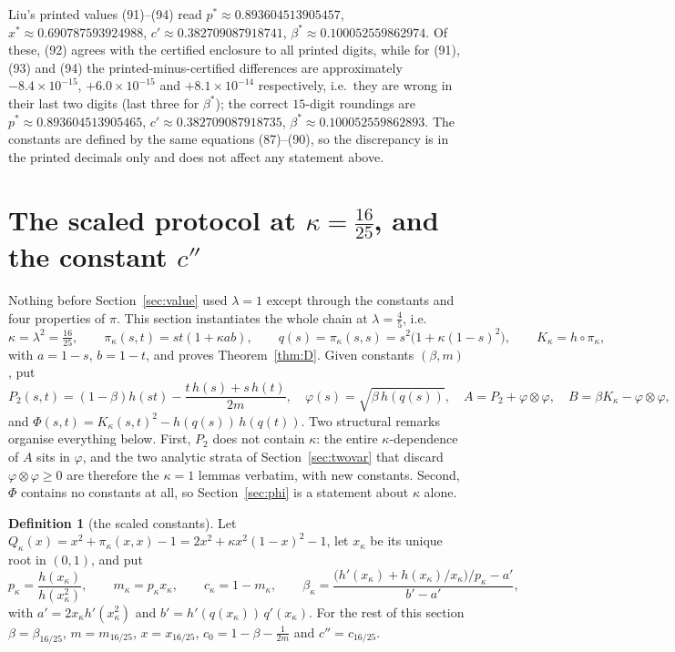 \documentclass[11pt]{article}
\theoremstyle{plain}
\theoremstyle{definition}
\newtheorem{definition}[theorem]{Definition}
\theoremstyle{remark}
\begin{document}
Liu's printed values (91)--(94) read $p^\ast\approx0.893604513905457$,
$x^\ast\approx0.690787593924988$, $c'\approx0.382709087918741$,
$\beta^\ast\approx0.100052559862974$.  Of these, (92) agrees with the
certified enclosure to all printed digits, while for (91), (93) and (94)
the printed-minus-certified differences are approximately
$-8.4\times10^{-15}$, $+6.0\times10^{-15}$ and $+8.1\times10^{-14}$
respectively, i.e.\ they are wrong in their last two digits (last three for
$\beta^\ast$); the correct $15$-digit roundings are
$p^\ast\approx0.893604513905465$, $c'\approx0.382709087918735$,
$\beta^\ast\approx0.100052559862893$.  The constants are defined by the
same equations (87)--(90), so the discrepancy is in the printed decimals
only and does not affect any statement above.

\section{The scaled protocol at \texorpdfstring{$\kappa=\tfrac{16}{25}$}{kappa=16/25}, and the constant \texorpdfstring{$c''$}{c''}}\label{sec:scaled}

Nothing before Section~\ref{sec:value} used $\lambda=1$ except through the
constants and four properties of $\pi$.  This section instantiates the whole
chain at $\lambda=\tfrac45$, i.e.
\begin{equation}\label{eq:kappa-objects}
  \kappa=\lambda^2=\tfrac{16}{25},\qquad
  \pi_\kappa(s,t)=st(1+\kappa ab),\qquad
  q(s)=\pi_\kappa(s,s)=s^2\bigl(1+\kappa(1-s)^2\bigr),\qquad K_\kappa=h\circ\pi_\kappa,
\end{equation}
with $a=1-s$, $b=1-t$, and proves Theorem~\ref{thm:D}.  Given constants
$(\beta,m)$, put
\begin{equation}\label{eq:kappa-kernels}
  P_2(s,t)=(1-\beta)h(st)-\frac{t\,h(s)+s\,h(t)}{2m},\quad
  \varphi(s)=\sqrt{\beta\,h(q(s))},\quad
  A=P_2+\varphi\otimes\varphi,\quad B=\beta K_\kappa-\varphi\otimes\varphi,
\end{equation}
and $\Phi(s,t)=K_\kappa(s,t)^2-h(q(s))\,h(q(t))$.  Two structural remarks
organise everything below.  First, $P_2$ does not contain $\kappa$: the entire
$\kappa$-dependence of $A$ sits in $\varphi$, and the two analytic strata of
Section~\ref{sec:twovar} that discard $\varphi\otimes\varphi\ge0$ are
therefore the $\kappa=1$ lemmas verbatim, with new constants.  Second, $\Phi$
contains no constants at all, so Section~\ref{sec:phi} is a statement about
$\kappa$ alone.

\begin{definition}[the scaled constants]\label{def:scaled}
Let $Q_\kappa(x)=x^2+\pi_\kappa(x,x)-1=2x^2+\kappa x^2(1-x)^2-1$, let $x_\kappa$
be its unique root in $(0,1)$, and put
\[
  p_\kappa=\frac{h(x_\kappa)}{h(x_\kappa^2)},\qquad m_\kappa=p_\kappa x_\kappa,
  \qquad c_\kappa=1-m_\kappa,\qquad
  \beta_\kappa=\frac{\bigl(h'(x_\kappa)+h(x_\kappa)/x_\kappa\bigr)/p_\kappa-a'}{b'-a'},
\]
with $a'=2x_\kappa h'(x_\kappa^2)$ and $b'=h'(q(x_\kappa))\,q'(x_\kappa)$.  For
the rest of this section $\beta=\beta_{16/25}$, $m=m_{16/25}$,
$x=x_{16/25}$, $c_0=1-\beta-\tfrac1{2m}$ and $c''=c_{16/25}$.
\end{definition}
\end{document}
